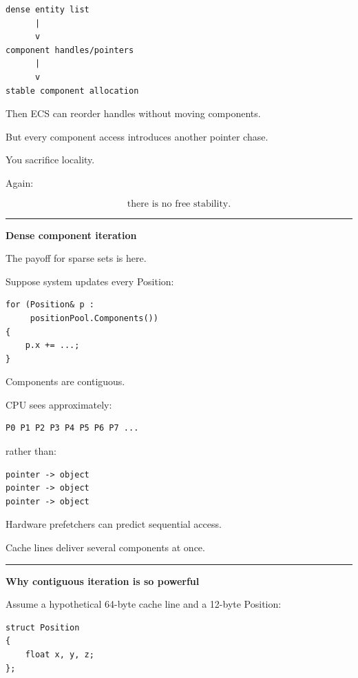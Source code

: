 \begin{verbatim}
dense entity list
      |
      v
component handles/pointers
      |
      v
stable component allocation
\end{verbatim}

Then ECS can reorder handles without moving components.

But every component access introduces another pointer chase.

You sacrifice locality.

Again:

\[
\boxed{
\text{there is no free stability}.
}
\]

\begin{center}\rule{0.5\linewidth}{0.5pt}\end{center}

\textbf{Dense component iteration}

The payoff for sparse sets is here.

Suppose system updates every Position:

\begin{verbatim}
for (Position& p :
     positionPool.Components())
{
    p.x += ...;
}
\end{verbatim}

Components are contiguous.

CPU sees approximately:

\begin{verbatim}
P0 P1 P2 P3 P4 P5 P6 P7 ...
\end{verbatim}

rather than:

\begin{verbatim}
pointer -> object
pointer -> object
pointer -> object
\end{verbatim}

Hardware prefetchers can predict sequential access.

Cache lines deliver several components at once.

\begin{center}\rule{0.5\linewidth}{0.5pt}\end{center}

\textbf{Why contiguous iteration is so powerful}

Assume a hypothetical 64-byte cache line and a 12-byte Position:

\begin{verbatim}
struct Position
{
    float x, y, z;
};
\end{verbatim}

